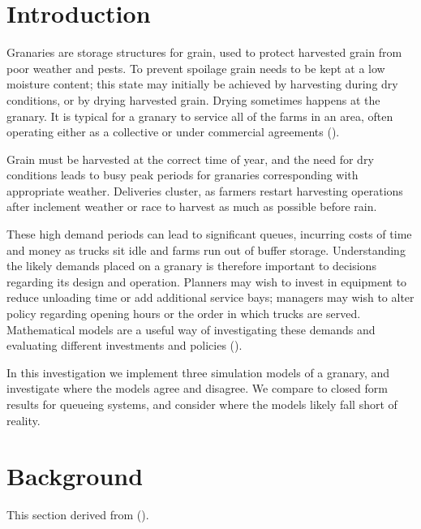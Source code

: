 \documentclass[a4paper, 10.5pt, oneside]{report}
\begin{document}


\tableofcontents


\chapter{Introduction}
Granaries are storage structures for grain, used to protect harvested grain from poor weather and pests.
To prevent spoilage grain needs to be kept at a low moisture content; this state may initially be achieved
by harvesting during dry conditions, or by drying harvested grain. Drying sometimes happens at the granary.
It is typical for a granary to service all of the farms in an area, often operating either as a collective or
under commercial agreements (\cite{hassanizadeh_discrete_2024}).

Grain must be harvested at the correct time of year, and the need for dry conditions leads to busy peak periods
for granaries corresponding with appropriate weather. Deliveries cluster, as farmers restart harvesting
operations after inclement weather or race to harvest as much as possible before rain.

These high demand periods can lead to significant queues, incurring costs of time and money as trucks sit idle
and farms run out of buffer storage. Understanding the likely demands placed on a granary is therefore important
to decisions regarding its design and operation. Planners may wish to invest in equipment to reduce unloading
time or add additional service bays; managers may wish to alter policy regarding opening hours or the order in
which trucks are served. Mathematical models are a useful way of investigating these demands and evaluating different investments and
policies (\cite{berruto_using_2000, kryukova2025optimizing, berruto_analyzing_2001}).

In this investigation we implement three simulation models of a granary, and investigate where the models
agree and disagree. We compare to closed form results for queueing systems, and consider where the models likely
fall short of reality.



\chapter{Background}
This section derived from (\cite{sztrik2016basic}).
\end{document}
